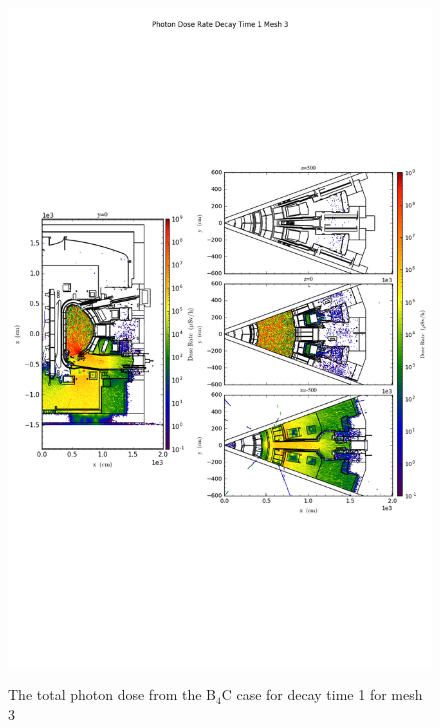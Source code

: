 \begin{figure}[ht!]
\centering
\includegraphics[trim={0cm 9cm 0cm 10cm},clip,scale=0.75]{../plots/final_model_nob4c/Photon_Dose_Rate_Decay_Time_1_Mesh_3.png}
\label{fig:photons_dc1_no4bc_m3_flux}
\caption{The total photon dose from the B$_4$C case for decay time 1 for mesh 3}
\end{figure}
